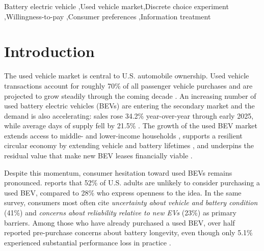 \documentclass[a4paper,fleqn]{cas-sc}   %
\begin{document}
\begin{keywords}

Battery electric vehicle \sep Used vehicle market\sep Discrete choice experiment \sep Willingness-to-pay \sep Consumer preferences \sep Information treatment
\end{keywords}

\maketitle
\renewcommand{\baselinestretch}{1}\normalsize
\section{Introduction}
\label{section:intro}

The used vehicle market is central to U.S. automobile ownership. Used vehicle transactions account for roughly 70\% of all passenger vehicle purchases and are projected to grow steadily through the coming decade \parencite{marketresearchfutureUnitedStatesUsed2025}. An increasing number of used battery electric vehicles (BEVs) are entering the secondary market and the demand is also accelerating: sales rose 34.2\% year-over-year through early 2025, while average days of supply fell by 21.5\% \parencite{coxautomotiveinc.EVMarketMonitor2025}. The growth of the used BEV market extends access to middle- and lower-income households \parencite{hagmanTotalCostOwnership2016}, supports a resilient circular economy by extending vehicle and battery lifetimes \parencite{guzekElectricVehiclesOverview2024}, and underpins the residual value that make new BEV leases financially viable \parencite{bruckmannResaleAnxietyObstacle2021, limMassAdoptionElectric2015}.

Despite this momentum, consumer hesitation toward used BEVs remains pronounced. \textcite{fernandesUSUnderstandingConsumer2023} reports that 52\% of U.S. adults are unlikely to consider purchasing a used BEV, compared to 28\% who express openness to the idea. In the same survey, consumers most often cite \textit{uncertainty about vehicle and battery condition} (41\%) and \textit{concerns about reliability relative to new EVs} (23\%) as primary barriers. Among those who have already purchased a used BEV, over half reported pre-purchase concerns about battery longevity, even though only 5.1\% experienced substantial performance loss in practice \parencite{sheykhfardAnalyzingPurchaseIntentions2025}. 
\end{document}

